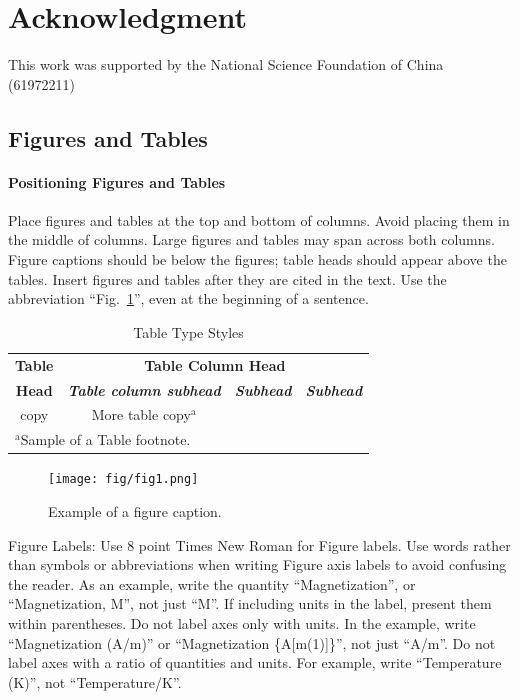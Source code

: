 \documentclass[conference]{IEEEtran}
\begin{document}
\section*{Acknowledgment}
This work was supported by the National Science Foundation of China (61972211)



\iffalse
\subsection{Figures and Tables}
\paragraph{Positioning Figures and Tables} Place figures and tables at the top and 
bottom of columns. Avoid placing them in the middle of columns. Large 
figures and tables may span across both columns. Figure captions should be 
below the figures; table heads should appear above the tables. Insert 
figures and tables after they are cited in the text. Use the abbreviation 
``Fig.~\ref{fig}'', even at the beginning of a sentence.

\begin{table}[htbp]
\caption{Table Type Styles}
\begin{center}
\begin{tabular}{|c|c|c|c|}
\hline
\textbf{Table}&\multicolumn{3}{|c|}{\textbf{Table Column Head}} \\
\cline{2-4} 
\textbf{Head} & \textbf{\textit{Table column subhead}}& \textbf{\textit{Subhead}}& \textbf{\textit{Subhead}} \\
\hline
copy& More table copy$^{\mathrm{a}}$& &  \\
\hline
\multicolumn{4}{l}{$^{\mathrm{a}}$Sample of a Table footnote.}
\end{tabular}
\label{tab1}
\end{center}
\end{table}

\begin{figure}[htbp]
\centerline{\texttt{[image: fig/fig1.png]}}
\caption{Example of a figure caption.}
\label{fig}
\end{figure}




Figure Labels: Use 8 point Times New Roman for Figure labels. Use words 
rather than symbols or abbreviations when writing Figure axis labels to 
avoid confusing the reader. As an example, write the quantity 
``Magnetization'', or ``Magnetization, M'', not just ``M''. If including 
units in the label, present them within parentheses. Do not label axes only 
with units. In the example, write ``Magnetization (A/m)'' or ``Magnetization 
\{A[m(1)]\}'', not just ``A/m''. Do not label axes with a ratio of 
quantities and units. For example, write ``Temperature (K)'', not 
``Temperature/K''.
\end{document}
